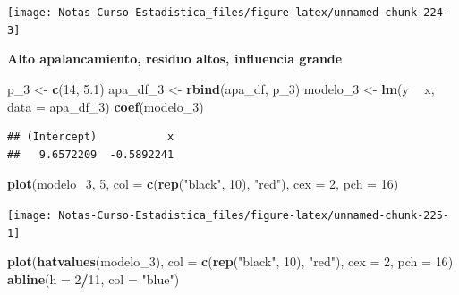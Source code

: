 \documentclass[
  12pt,
]{book}
\newenvironment{Shaded}{\begin{snugshade}}{\end{snugshade}}
\newcommand{\DataTypeTok}[1]{\textcolor[rgb]{0.13,0.29,0.53}{#1}}
\newcommand{\DecValTok}[1]{\textcolor[rgb]{0.00,0.00,0.81}{#1}}
\newcommand{\FloatTok}[1]{\textcolor[rgb]{0.00,0.00,0.81}{#1}}
\newcommand{\KeywordTok}[1]{\textcolor[rgb]{0.13,0.29,0.53}{\textbf{#1}}}
\newcommand{\NormalTok}[1]{#1}
\newcommand{\OperatorTok}[1]{\textcolor[rgb]{0.81,0.36,0.00}{\textbf{#1}}}
\newcommand{\StringTok}[1]{\textcolor[rgb]{0.31,0.60,0.02}{#1}}
\theoremstyle{definition}
\theoremstyle{definition}
\theoremstyle{definition}
\theoremstyle{remark}
\begin{document}
\begin{center}\texttt{[image: Notas-Curso-Estadistica\_files/figure-latex/unnamed-chunk-224-3]} \end{center}

\textbf{Alto apalancamiento, residuo altos, influencia grande}

\begin{Shaded}
\begin{Highlighting}[]
\NormalTok{p_}\DecValTok{3}\NormalTok{ <-}\StringTok{ }\KeywordTok{c}\NormalTok{(}\DecValTok{14}\NormalTok{, }\FloatTok{5.1}\NormalTok{)}
\NormalTok{apa_df_}\DecValTok{3}\NormalTok{ <-}\StringTok{ }\KeywordTok{rbind}\NormalTok{(apa_df, p_}\DecValTok{3}\NormalTok{)}
\NormalTok{modelo_}\DecValTok{3}\NormalTok{ <-}\StringTok{ }\KeywordTok{lm}\NormalTok{(y }\OperatorTok{~}\StringTok{ }\NormalTok{x, }\DataTypeTok{data =}\NormalTok{ apa_df_}\DecValTok{3}\NormalTok{)}
\KeywordTok{coef}\NormalTok{(modelo_}\DecValTok{3}\NormalTok{)}
\end{Highlighting}
\end{Shaded}

\begin{verbatim}
## (Intercept)           x 
##   9.6572209  -0.5892241
\end{verbatim}

\begin{Shaded}
\begin{Highlighting}[]
\KeywordTok{plot}\NormalTok{(modelo_}\DecValTok{3}\NormalTok{, }\DecValTok{5}\NormalTok{, }\DataTypeTok{col =} \KeywordTok{c}\NormalTok{(}\KeywordTok{rep}\NormalTok{(}\StringTok{"black"}\NormalTok{, }\DecValTok{10}\NormalTok{), }\StringTok{"red"}\NormalTok{), }
    \DataTypeTok{cex =} \DecValTok{2}\NormalTok{, }\DataTypeTok{pch =} \DecValTok{16}\NormalTok{)}
\end{Highlighting}
\end{Shaded}

\begin{center}\texttt{[image: Notas-Curso-Estadistica\_files/figure-latex/unnamed-chunk-225-1]} \end{center}

\begin{Shaded}
\begin{Highlighting}[]
\KeywordTok{plot}\NormalTok{(}\KeywordTok{hatvalues}\NormalTok{(modelo_}\DecValTok{3}\NormalTok{), }\DataTypeTok{col =} \KeywordTok{c}\NormalTok{(}\KeywordTok{rep}\NormalTok{(}\StringTok{"black"}\NormalTok{, }\DecValTok{10}\NormalTok{), }
    \StringTok{"red"}\NormalTok{), }\DataTypeTok{cex =} \DecValTok{2}\NormalTok{, }\DataTypeTok{pch =} \DecValTok{16}\NormalTok{)}
\KeywordTok{abline}\NormalTok{(}\DataTypeTok{h =} \DecValTok{2}\OperatorTok{/}\DecValTok{11}\NormalTok{, }\DataTypeTok{col =} \StringTok{"blue"}\NormalTok{)}
\end{Highlighting}
\end{Shaded}
\end{document}
